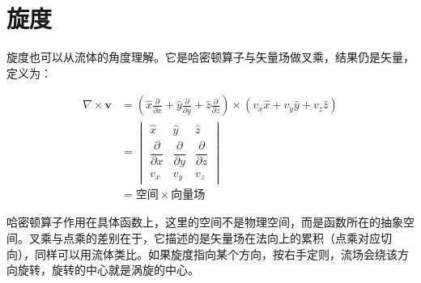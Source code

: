 \section{旋度}

旋度也可以从流体的角度理解。它是哈密顿算子与矢量场做叉乘，结果仍是矢量，定义为：

\begin{align}
\nabla \times \mathbf{v}
&=\left(\hat{x}\frac{\partial}{\partial x} + \hat{y}\frac{\partial}{\partial y} + \hat{z}\frac{\partial}{\partial z}\right)\times
\left(v_x\hat{x}+v_y\hat{y}+v_z\hat{z}\right) \\
&=
\begin{vmatrix}
\hat{x} & \hat{y} & \hat{z} \\
\dfrac{\partial}{\partial x} & \dfrac{\partial}{\partial y} & \dfrac{\partial}{\partial z} \\
v_x & v_y & v_z
\end{vmatrix} \\
&=空间 \times 向量场
\end{align}

哈密顿算子作用在具体函数上，这里的空间不是物理空间，而是函数所在的抽象空间。叉乘与点乘的差别在于，它描述的是矢量场在法向上的累积（点乘对应切向），同样可以用流体类比。如果旋度指向某个方向，按右手定则，流场会绕该方向旋转，旋转的中心就是涡旋的中心。
